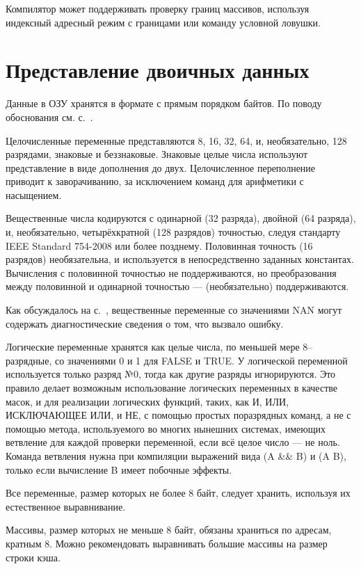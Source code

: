 \documentclass[forwardcom.tex]{subfiles}
\begin{document}
Компилятор может поддерживать проверку границ массивов, используя индексный адресный режим с границами или команду условной ловушки.

\section{Представление двоичных данных} \label{binaryDataRepresentation}
Данные в ОЗУ хранятся в формате с прямым порядком байтов. По поводу обоснования см. с.~\pageref{endianness}.

Целочисленные переменные представляются 8, 16, 32, 64, и, необязательно, 128 разрядами, знаковые и беззнаковые. Знаковые целые числа используют представление в виде дополнения до двух. Целочисленное переполнение приводит к заворачиванию, за исключением команд для арифметики с насыщением.

Вещественные числа кодируются с одинарной (32 разряда), двойной (64 разряда), и, необязательно, четырёхкратной (128 разрядов) точностью, следуя стандарту IEEE Standard 754-2008 или более позднему. Половинная точность (16 разрядов) необязательна, и используется в непосредственно заданных константах. Вычисления с половинной точностью не поддерживаются, но преобразования между половинной и одинарной точностью --- (необязательно) поддерживаются.

Как обсуждалось на с.~\pageref{nanPropagation}, вещественные переменные со значениями NAN могут содержать диагностические сведения о том, что вызвало ошибку.

Логические переменные хранятся как целые числа, по меньшей мере 8--разрядные, со значениями 0 и 1 для FALSE и TRUE. У логической переменной используется только разряд №0, тогда как другие разряды игнорируются. Это правило делает возможным использование логических переменных в качестве масок, и для реализации логических функций, таких, как И, ИЛИ, ИСКЛЮЧАЮЩЕЕ ИЛИ, и НЕ, с помощью простых поразрядных команд, а не с помощью метода, используемого во многих нынешних системах, имеющих ветвление для каждой проверки переменной, если всё целое число --- не ноль. Команда ветвления нужна при компиляции выражений вида (A \&\& B) и (A \textbar\textbar{} B), только если вычисление B имеет побочные эффекты.

Все переменные, размер которых не более 8 байт, следует хранить, используя их естественное выравнивание.

Массивы, размер которых не меньше 8 байт, обязаны храниться по адресам, кратным 8. Можно рекомендовать выравнивать большие массивы на размер строки кэша.
\end{document}
